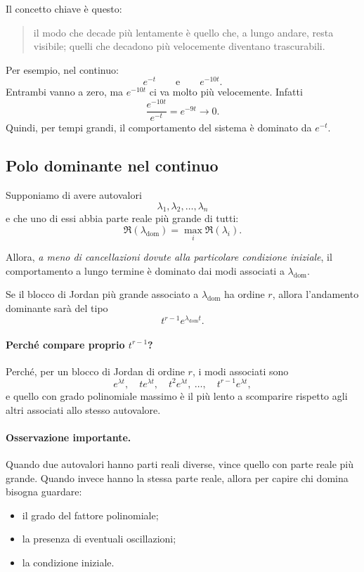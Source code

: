 Il concetto chiave è questo:

\begin{quote}
il modo che decade più lentamente è quello che, a lungo andare, resta visibile; quelli che decadono più velocemente diventano trascurabili.
\end{quote}

Per esempio, nel continuo:
\[
e^{-t}
\qquad \text{e} \qquad
e^{-10t}.
\]
Entrambi vanno a zero, ma $e^{-10t}$ ci va molto più velocemente.  
Infatti
\[
\frac{e^{-10t}}{e^{-t}}=e^{-9t}\to 0.
\]
Quindi, per tempi grandi, il comportamento del sistema è dominato da $e^{-t}$.

\subsection{Polo dominante nel continuo}

Supponiamo di avere autovalori
\[
\lambda_1,\lambda_2,\dots,\lambda_n
\]
e che uno di essi abbia parte reale più grande di tutti:
\[
\Re(\lambda_{\mathrm{dom}})=\max_i \Re(\lambda_i).
\]

Allora, \emph{a meno di cancellazioni dovute alla particolare condizione iniziale}, il comportamento a lungo termine è dominato dai modi associati a $\lambda_{\mathrm{dom}}$.

Se il blocco di Jordan più grande associato a $\lambda_{\mathrm{dom}}$ ha ordine $r$, allora l'andamento dominante sarà del tipo
\begin{equation}
t^{r-1}e^{\lambda_{\mathrm{dom}}t}.
\label{eq:L10_dom_CT}
\end{equation}

\paragraph{Perché compare proprio $t^{r-1}$?}
Perché, per un blocco di Jordan di ordine $r$, i modi associati sono
\[
e^{\lambda t},\quad
t e^{\lambda t},\quad
t^2 e^{\lambda t},\ \dots,\quad
t^{r-1}e^{\lambda t},
\]
e quello con grado polinomiale massimo è il più lento a scomparire rispetto agli altri associati allo stesso autovalore.

\paragraph{Osservazione importante.}
Quando due autovalori hanno parti reali diverse, vince quello con parte reale più grande.
Quando invece hanno la stessa parte reale, allora per capire chi domina bisogna guardare:
\begin{itemize}
    \item il grado del fattore polinomiale;
    \item la presenza di eventuali oscillazioni;
    \item la condizione iniziale.
\end{itemize}

